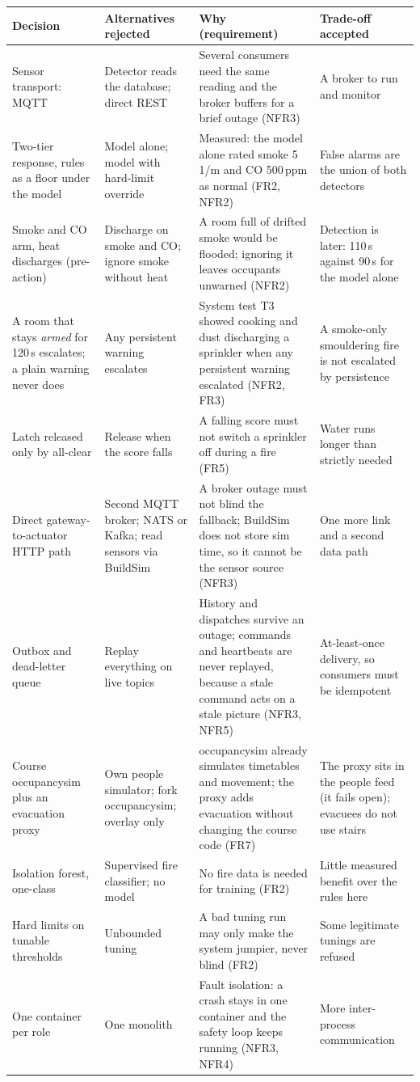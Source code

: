 \documentclass[11pt]{article}
\begin{document}
{\setlength{\extrarowheight}{1pt}\begin{longtable}{@{}L{2.8cm}L{3.0cm}L{6.4cm}L{3.4cm}@{}}
\toprule
Decision & Alternatives rejected & Why (requirement) & Trade-off accepted\\
\midrule\endhead
Sensor transport: MQTT & Detector reads the database; direct REST & Several consumers need the same reading and the broker buffers for a brief outage (NFR3) & A broker to run and monitor\\
Two-tier response, rules as a floor under the model & Model alone; model with hard-limit override & Measured: the model alone rated smoke 5\,1/m and CO 500\,ppm as normal (FR2, NFR2) & False alarms are the union of both detectors\\
Smoke and CO arm, heat discharges (pre-action) & Discharge on smoke and CO; ignore smoke without heat & A room full of drifted smoke would be flooded; ignoring it leaves occupants unwarned (NFR2) & Detection is later: 110\,s against 90\,s for the model alone\\
A room that stays \emph{armed} for 120\,s escalates; a plain warning never does & Any persistent warning escalates & System test T3 showed cooking and dust discharging a sprinkler when any persistent warning escalated (NFR2, FR3) & A smoke-only smouldering fire is not escalated by persistence\\
Latch released only by all-clear & Release when the score falls & A falling score must not switch a sprinkler off during a fire (FR5) & Water runs longer than strictly needed\\
Direct gateway-to-actuator HTTP path & Second MQTT broker; NATS or Kafka; read sensors via BuildSim & A broker outage must not blind the fallback; BuildSim does not store sim time, so it cannot be the sensor source (NFR3) & One more link and a second data path\\
Outbox and dead-letter queue & Replay everything on live topics & History and dispatches survive an outage; commands and heartbeats are never replayed, because a stale command acts on a stale picture (NFR3, NFR5) & At-least-once delivery, so consumers must be idempotent\\
Course occupancysim plus an evacuation proxy & Own people simulator; fork occupancysim; overlay only & occupancysim already simulates timetables and movement; the proxy adds evacuation without changing the course code (FR7) & The proxy sits in the people feed (it fails open); evacuees do not use stairs\\
Isolation forest, one-class & Supervised fire classifier; no model & No fire data is needed for training (FR2) & Little measured benefit over the rules here\\
Hard limits on tunable thresholds & Unbounded tuning & A bad tuning run may only make the system jumpier, never blind (FR2) & Some legitimate tunings are refused\\
One container per role & One monolith & Fault isolation: a crash stays in one container and the safety loop keeps running (NFR3, NFR4) & More inter-process communication\\
\bottomrule
\end{longtable}}
\end{document}
